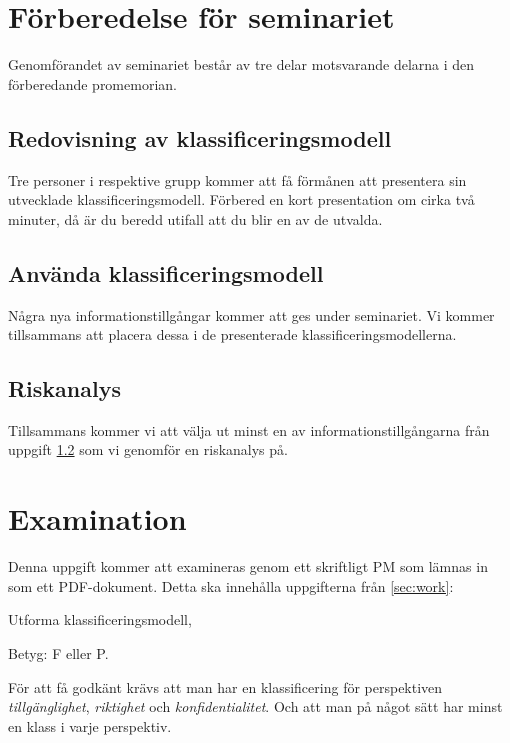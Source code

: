\documentclass[a4paper]{llncs}
\begin{document}
\section{Förberedelse för seminariet}
\noindent
Genomförandet av seminariet består av tre delar motsvarande delarna i den 
förberedande promemorian.

\subsection{Redovisning av klassificeringsmodell}
\label{sec:present}
\noindent
Tre personer i respektive grupp kommer att få förmånen att presentera sin 
utvecklade klassificeringsmodell.
Förbered en kort presentation om cirka två minuter, då är du beredd utifall att 
du blir en av de utvalda.

\subsection{Använda klassificeringsmodell}
\label{sec:use}
\noindent
Några nya informationstillgångar kommer att ges under seminariet.
Vi kommer tillsammans att placera dessa i de presenterade 
klassificeringsmodellerna.

\subsection{Riskanalys}
\label{sec:risk}
\noindent
Tillsammans kommer vi att välja ut minst en av informationstillgångarna från 
uppgift \ref{sec:use} som vi genomför en riskanalys på.


\section{Examination}
\label{sec:examination}
\noindent
Denna uppgift kommer att examineras genom ett skriftligt PM som lämnas in som 
ett PDF-dokument.
Detta ska innehålla uppgifterna från \cref{sec:work}:
\begin{exercise}
  Utforma klassificeringsmodell,
  \begin{solution}
    Betyg: F eller P.

    För att få godkänt krävs att man har en klassificering för perspektiven 
    \emph{tillgänglighet}, \emph{riktighet} och \emph{konfidentialitet}.
    Och att man på något sätt har minst en klass i varje perspektiv.
  \end{solution}
\end{exercise}
\end{document}

